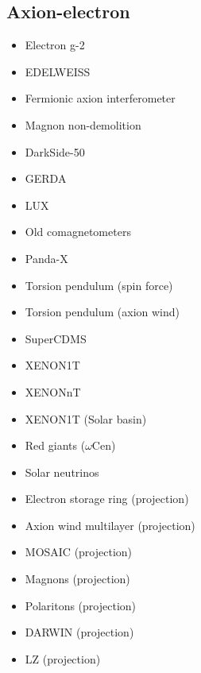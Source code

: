 \documentclass[8pt,twocolumn]{extarticle}
\begin{document}
\begin{mdframed}
\vspace{-1em}
\section{Axion-electron}\vspace{-0.5em}
\begin{itemize}\setlength\itemsep{-0.5em}
	\item Electron g-2~\cite{Yan:2019dar}
    \item EDELWEISS~\cite{EDELWEISS:2018tde}
    \item Fermionic axion interferometer~\cite{Crescini:2023zyl}
    \item Magnon non-demolition~\cite{Ikeda:2021mlv}
    \item DarkSide-50~\cite{DarkSide:2022knj}
    \item GERDA~\cite{GERDA:2020emj}
    \item LUX~\cite{LUX:2017glr}
    \item Old comagnetometers~\cite{Bloch:2019lcy}
    \item Panda-X~\cite{PandaX:2017ock,PandaX:2024cic,PandaX:2024kjp}
    \item Torsion pendulum (spin force)~\cite{Terrano:2015sna}
    \item Torsion pendulum (axion wind)~\cite{Terrano:2019clh}
    \item SuperCDMS~\cite{SuperCDMS:2019jxx}
    \item XENON1T~\cite{XENON:2019gfn,XENON:2020rca}
    \item XENONnT~\cite{XENONCollaboration:2022kmb}
    \item XENON1T (Solar basin)~\cite{VanTilburg:2020jvl}
    \item Red giants ($\omega$Cen)~\cite{Capozzi:2020cbu}
    \item Solar neutrinos~\cite{Gondolo:2008dd}
    \item Electron storage ring (projection)~\cite{Brandenstein:2022eif}
    \item Axion wind multilayer (projection)~\cite{Berlin:2023ubt}
    \item MOSAIC (projection)~\cite{Chang:2025sno}
    \item Magnons (projection)~\cite{Chigusa:2020gfs}
        \item Polaritons (projection)~\cite{Mitridate:2020kly}
    \item DARWIN (projection)~\cite{DARWIN:2016hyl}
    \item LZ (projection)~\cite{LZ:2021xov}

\end{itemize}
\end{mdframed}
\end{document}
